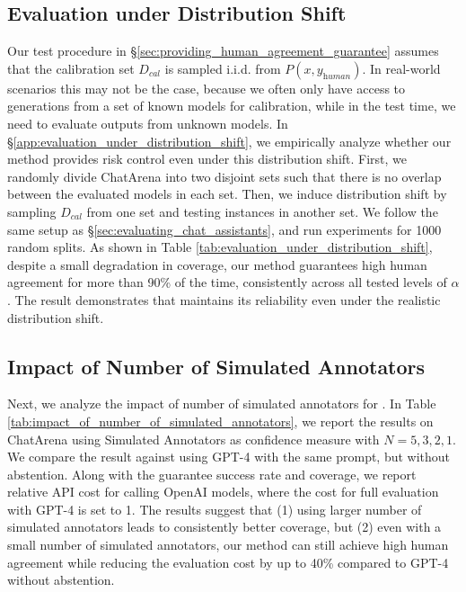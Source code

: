 \subsection{Evaluation under Distribution Shift} Our test procedure in \S \ref{sec:providing_human_agreement_guarantee} assumes that the calibration set $D_\textit{cal}$ is sampled i.i.d. from $P(x, y_\textit{human})$. In real-world scenarios this may not be the case, because we often only have access to generations from a set of known models for calibration, while in the test time, we need to evaluate outputs from unknown models. In \S\ref{app:evaluation_under_distribution_shift}, we empirically analyze whether our method provides risk control even under this distribution shift. First, we randomly divide ChatArena into two disjoint sets such that there is no overlap between the evaluated models in each set. Then, we induce distribution shift by sampling $D_\textit{cal}$ from one set and testing instances in another set. We follow the same setup as \S \ref{sec:evaluating_chat_assistants}, and run experiments for 1000 random splits. As shown in Table \ref{tab:evaluation_under_distribution_shift}, despite a small degradation in coverage, our method guarantees high human agreement for more than 90\% of the time, consistently across all tested levels of $\alpha$. The result demonstrates that \method maintains its reliability even under the realistic distribution shift.



\subsection{Impact of Number of Simulated Annotators}\label{sec:impact_of_number_of_simulated_annotators} 
Next, we analyze the impact of number of simulated annotators for \method. In Table \ref{tab:impact_of_number_of_simulated_annotators}, we report the results on ChatArena using Simulated Annotators as confidence measure with $N = 5, 3, 2, 1$. We compare the result against using GPT-4 with the same prompt, but without abstention. Along with the guarantee success rate and coverage, we report relative API cost for calling OpenAI models, where the cost for full evaluation with GPT-4 is set to 1. The results suggest that (1) using larger number of simulated annotators leads to consistently better coverage, but (2) even with a small number of simulated annotators, our method can still achieve high human agreement while reducing the evaluation cost by up to 40\% compared to GPT-4 without abstention.

